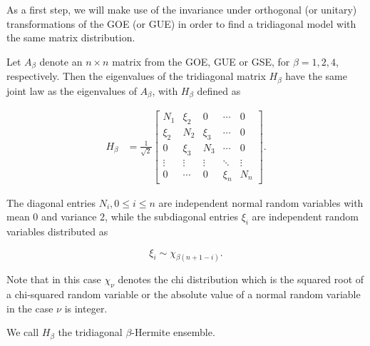 As a first step, we will make use of the invariance under orthogonal (or unitary) transformations of the GOE (or GUE) in order to find a tridiagonal model with the same matrix distribution.


\begin{lemma} \label{lemma:tridiag}
    Let $A_{\beta}$ denote an $n\times n$ matrix from the GOE, GUE or GSE, for $\beta = 1,2,4$, respectively. Then the eigenvalues of the tridiagonal matrix $H_\beta$ have the same joint law as the eigenvalues of $A_\beta$, with $H_\beta$ defined as

    \begin{align} \label{eq:tridiag_hermite}
        H_\beta &= \frac1{\sqrt2}\begin{bmatrix}
            N_1   & \xi_2 & 0     & \cdots & 0 \\ 
            \xi_2 & N_2   & \xi_3 & \cdots & 0 \\
            0     & \xi_3 & N_3  & \cdots & 0 \\
            \vdots & \vdots & \vdots & \ddots & \vdots \\ 
            0      & \cdots & 0      & \xi_{n} & N_n 
        \end{bmatrix}.
    \end{align}

    The diagonal entries $N_i, 0 \le i \le n$ are independent normal random variables with mean 0 and variance 2, while the subdiagonal entries $\xi_i$ are independent random variables distributed as

    \[ \xi_i \sim \chi_{\beta(n+1-i)}. \]

    Note that in this case $\chi_\nu$ denotes the chi distribution which is the squared root of a chi-squared random variable or the absolute value of a normal random variable in the case $\nu$ is integer.

    We call $H_\beta$ the tridiagonal $\beta$-Hermite ensemble.
\end{lemma}

